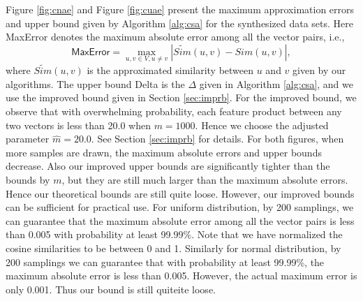 \documentclass{article}
\begin{document}
Figure \ref{fig:cnae} and Figure \ref{fig:cuae} present the maximum approximation errors and upper bound given by Algorithm \ref{alg:csa} for the synthesized data sets.
Here \textsf{MaxError} denotes the maximum absolute error among all the vector pairs, i.e.,
$$\textsf{MaxError} = \max_{u,v\in V,u\not= v} |\widetilde{Sim}(u,v) - Sim(u,v)|,$$
where $\widetilde{Sim}(u,v)$ is the approximated similarity between $u$ and $v$ given by our algorithms. The upper bound \textsf{Delta} is the $\Delta$ given in Algorithm \ref{alg:csa}, and we use the improved bound given in Section \ref{sec:imprb}. For the improved bound, we observe that with overwhelming probability, each feature product between any two vectors is less than 20.0 when $m=1000$. Hence we choose the adjusted parameter $\hat{m} = 20.0$. See Section \ref{sec:imprb} for details. 
For both figures, when more samples are drawn, the maximum absolute errors and upper bounds decrease. Also our improved upper bounds are significantly tighter than the bounds by $m$, but they are still much larger than the maximum absolute errors. Hence our theoretical bounds are still quite loose. However, our improved bounds can be sufficient for practical use. For uniform distribution, by 200 samplings, we can guarantee that the maximum absolute error among all the vector pairs is less than 0.005 with probability at least 99.99\%. Note that we have normalized the cosine similarities to be between 0 and 1. Similarly for normal distribution, by 200 samplings we can guarantee that with probability at least 99.99\%, the maximum absolute error is less than 0.005. However, the actual maximum error is only 0.001. Thus our bound is still quiteite loose.
\end{document}
